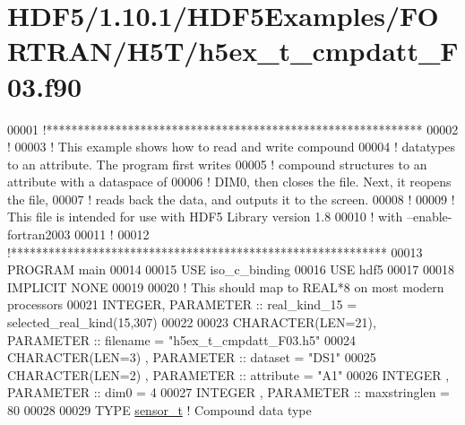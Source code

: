 \hypertarget{_h_d_f5_21_810_81_2_h_d_f5_examples_2_f_o_r_t_r_a_n_2_h5_t_2h5ex__t__cmpdatt___f03_8f90_source}{}\section{H\+D\+F5/1.10.1/\+H\+D\+F5\+Examples/\+F\+O\+R\+T\+R\+A\+N/\+H5\+T/h5ex\+\_\+t\+\_\+cmpdatt\+\_\+\+F03.f90}
\label{_h_d_f5_21_810_81_2_h_d_f5_examples_2_f_o_r_t_r_a_n_2_h5_t_2h5ex__t__cmpdatt___f03_8f90_source}

\begin{DoxyCode}
00001 \textcolor{comment}{!************************************************************}
00002 \textcolor{comment}{!}
00003 \textcolor{comment}{!  This example shows how to read and write compound}
00004 \textcolor{comment}{!  datatypes to an attribute.  The program first writes}
00005 \textcolor{comment}{!  compound structures to an attribute with a dataspace of}
00006 \textcolor{comment}{!  DIM0, then closes the file.  Next, it reopens the file,}
00007 \textcolor{comment}{!  reads back the data, and outputs it to the screen.}
00008 \textcolor{comment}{!}
00009 \textcolor{comment}{!  This file is intended for use with HDF5 Library version 1.8}
00010 \textcolor{comment}{!  with --enable-fortran2003}
00011 \textcolor{comment}{!}
00012 \textcolor{comment}{!************************************************************}
00013 \textcolor{keyword}{PROGRAM} main
00014 
00015   \textcolor{keywordtype}{USE }iso\_c\_binding
00016   \textcolor{keywordtype}{USE }hdf5
00017 
00018   \textcolor{keywordtype}{IMPLICIT NONE}
00019 
00020   \textcolor{comment}{! This should map to REAL*8 on most modern processors}
00021   \textcolor{keywordtype}{INTEGER}, \textcolor{keywordtype}{PARAMETER} :: real\_kind\_15 = selected\_real\_kind(15,307)
00022 
00023   \textcolor{keywordtype}{CHARACTER(LEN=21)}, \textcolor{keywordtype}{PARAMETER} :: filename     = \textcolor{stringliteral}{"h5ex\_t\_cmpdatt\_F03.h5"}
00024   \textcolor{keywordtype}{CHARACTER(LEN=3)} , \textcolor{keywordtype}{PARAMETER} :: dataset      = \textcolor{stringliteral}{"DS1"}
00025   \textcolor{keywordtype}{CHARACTER(LEN=2)} , \textcolor{keywordtype}{PARAMETER} :: attribute    = \textcolor{stringliteral}{"A1"}
00026   \textcolor{keywordtype}{INTEGER}          , \textcolor{keywordtype}{PARAMETER} :: dim0         = 4
00027   \textcolor{keywordtype}{INTEGER}          , \textcolor{keywordtype}{PARAMETER} :: maxstringlen = 80
00028 
00029   \textcolor{keyword}{TYPE} \hyperlink{structsensor__t}{sensor\_t} \textcolor{comment}{! Compound data type}

\end{DoxyCode}
